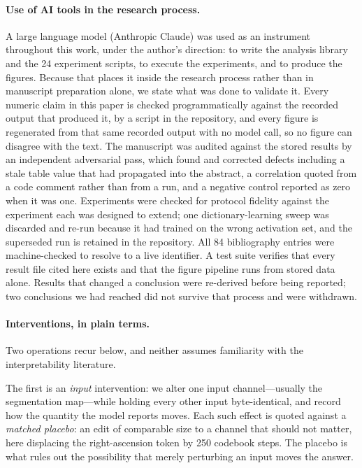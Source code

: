 \documentclass[11pt]{article}
\begin{document}
\paragraph{Use of AI tools in the research process.} A large language model
(Anthropic Claude) was used as an instrument throughout this work, under the author's direction:
to write the analysis library and the 24 experiment scripts, to execute the experiments, and to
produce the figures. Because that places it inside the research process rather than in
manuscript preparation alone, we state what was done to validate it. Every numeric claim in this
paper is checked programmatically against the recorded output that produced it, by a script in
the repository, and every figure is regenerated from that same recorded output with no model
call, so no figure can disagree with the text. The manuscript was audited against the stored
results by an independent adversarial pass, which found and corrected defects including a stale
table value that had propagated into the abstract, a correlation quoted from a code comment
rather than from a run, and a negative control reported as zero when it was one. Experiments
were checked for protocol fidelity against the experiment each was designed to extend; one
dictionary-learning sweep was discarded and re-run because it had trained on the wrong
activation set, and the superseded run is retained in the repository. All \num{84} bibliography
entries were machine-checked to resolve to a live identifier. A test suite verifies that every
result file cited here exists and that the figure pipeline runs from stored data alone. Results
that changed a conclusion were re-derived before being reported; two conclusions we had reached
did not survive that process and were withdrawn.

\paragraph{Interventions, in plain terms.} Two operations recur below, and neither assumes
familiarity with the interpretability literature.

The first is an \emph{input} intervention: we alter one input channel---usually the segmentation
map---while holding every other input byte-identical, and record how the quantity the model
reports moves. Each such effect is quoted against a \emph{matched placebo}: an edit of
comparable size to a channel that should not matter, here displacing the right-ascension token
by 250 codebook steps. The placebo is what rules out the possibility that merely perturbing an
input moves the answer.
\end{document}
